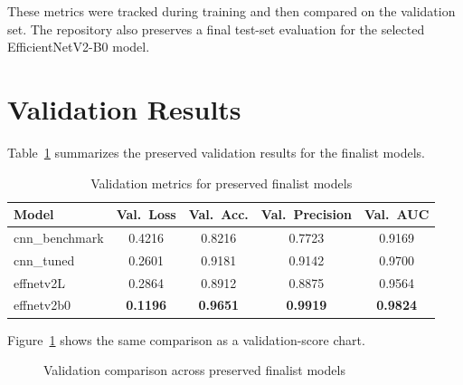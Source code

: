 \documentclass[11pt]{article}
\begin{document}
These metrics were tracked during training and then compared on the validation set. The repository also preserves a final test-set evaluation for the selected EfficientNetV2-B0 model.

\section{Validation Results}

Table~\ref{tab:validation-results} summarizes the preserved validation results for the finalist models.

\begin{table}[htbp]
\centering
\caption{Validation metrics for preserved finalist models}
\label{tab:validation-results}
\begin{tabular}{lcccc}
\toprule
Model & Val.\ Loss & Val.\ Acc. & Val.\ Precision & Val.\ AUC \\
\midrule
cnn\_benchmark & 0.4216 & 0.8216 & 0.7723 & 0.9169 \\
cnn\_tuned     & 0.2601 & 0.9181 & 0.9142 & 0.9700 \\
effnetv2L      & 0.2864 & 0.8912 & 0.8875 & 0.9564 \\
effnetv2b0     & \textbf{0.1196} & \textbf{0.9651} & \textbf{0.9919} & \textbf{0.9824} \\
\bottomrule
\end{tabular}
\end{table}

Figure~\ref{fig:model-comparison} shows the same comparison as a validation-score chart.

\begin{figure}[htbp]
\centering
{}
\caption{Validation comparison across preserved finalist models}
\label{fig:model-comparison}
\end{figure}
\end{document}
